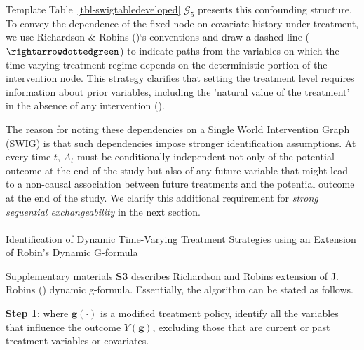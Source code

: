 \documentclass[
  single column]{article}
\makeatletter
\let\oldparagraph\paragraph
\renewcommand{\paragraph}{
    \@ifstar
      \xxxParagraphStar
      \xxxParagraphNoStar
  }
\newcommand{\xxxParagraphStar}[1]{\oldparagraph*{#1}\mbox{}}
\newcommand{\xxxParagraphNoStar}[1]{\oldparagraph{#1}\mbox{}}
\makeatother
\begin{document}
Template Table~\ref{tbl-swigtabledeveloped} \(\mathcal{G}_5\) presents
this confounding structure. To convey the dependence of the fixed node
on covariate history under treatment, we use Richardson \& Robins
()`s conventions and draw a dashed
line (\(\rightarrowdottedgreen\)) to indicate paths from the variables
on which the time-varying treatment regime depends on the deterministic
portion of the intervention node. This strategy clarifies that setting
the treatment level requires information about prior variables,
including the 'natural value of the treatment' in the absence of any
intervention ().

The reason for noting these dependencies on a Single World Intervention
Graph (SWIG) is that such dependencies impose stronger identification
assumptions. At every time \(t\), \(A_t\) must be conditionally
independent not only of the potential outcome at the end of the study
but also of any future variable that might lead to a non-causal
association between future treatments and the potential outcome at the
end of the study. We clarify this additional requirement for
\emph{strong sequential exchangeability} in the next section.

\paragraph{Identification of Dynamic Time-Varying Treatment Strategies
using an Extension of Robin's Dynamic
G-formula}\label{identification-of-dynamic-time-varying-treatment-strategies-using-an-extension-of-robins-dynamic-g-formula}

Supplementary materials \textbf{S3} describes Richardson and Robins
extension of J. Robins () dynamic
g-formula. Essentially, the algorithm can be stated as follows.

\textbf{Step 1}: where \(\mathbf{g}(\cdot)\) is a modified treatment
policy, identify all the variables that influence the outcome
\(Y(\mathbf{g})\), excluding those that are current or past treatment
variables or covariates.
\end{document}
